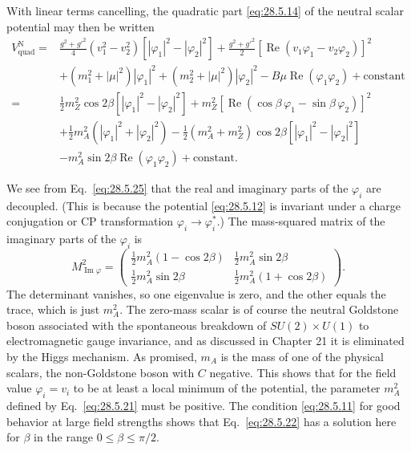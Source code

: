 With linear terms cancelling, the quadratic part \eqref{eq:28.5.14} of
the neutral scalar potential may then be written
\begin{equation}
  \begin{aligned}
  V_{\mathrm{quad}}^{\mathrm N}
  ={}&
    \frac{g^2+g'^2}{4}(v_1^2-v_2^2)
      \left[|\varphi_1|^2-|\varphi_2|^2\right]
    +\frac{g^2+g'^2}{2}
      \left[\operatorname{Re}(v_1\varphi_1-v_2\varphi_2)\right]^2\\
  &+(m_1^2+|\mu|^2)|\varphi_1|^2
    +(m_2^2+|\mu|^2)|\varphi_2|^2
    -B\mu\operatorname{Re}(\varphi_1\varphi_2)
    +\text{constant}\\
  ={}&
    \frac12m_Z^2\cos2\beta
      \left[|\varphi_1|^2-|\varphi_2|^2\right]
    +m_Z^2
      \left[
        \operatorname{Re}(\cos\beta\,\varphi_1-\sin\beta\,\varphi_2)
      \right]^2\\
  &+\frac12m_A^2\left(|\varphi_1|^2+|\varphi_2|^2\right)
    -\frac12(m_A^2+m_Z^2)\cos2\beta
      \left[|\varphi_1|^2-|\varphi_2|^2\right]\\
  &-m_A^2\sin2\beta\operatorname{Re}(\varphi_1\varphi_2)
    +\text{constant}.
  \end{aligned}
  \tag{28.5.25}\label{eq:28.5.25}
\end{equation}

We see from Eq.~\eqref{eq:28.5.25} that the real and imaginary parts of
the \(\varphi_i\) are decoupled. (This is because the potential
\eqref{eq:28.5.12} is invariant under a charge conjugation or CP
transformation \(\varphi_i\longrightarrow\varphi_i^*\).) The mass-squared
matrix of the imaginary parts of the \(\varphi_i\) is
\begin{equation}
  M_{\operatorname{Im}\varphi}^2
  =
  \begin{pmatrix}
    \frac12m_A^2(1-\cos2\beta) & \frac12m_A^2\sin2\beta\\
    \frac12m_A^2\sin2\beta & \frac12m_A^2(1+\cos2\beta)
  \end{pmatrix}.
  \tag{28.5.26}\label{eq:28.5.26}
\end{equation}
The determinant vanishes, so one eigenvalue is zero, and the other equals
the trace, which is just \(m_A^2\). The zero-mass scalar is of course the
neutral Goldstone boson associated with the spontaneous breakdown of
\(SU(2)\times U(1)\) to electromagnetic gauge invariance, and as
discussed in Chapter 21 it is eliminated by the Higgs mechanism. As
promised, \(m_A\) is the mass of one of the physical scalars, the
non-Goldstone boson with \(C\) negative. This shows that for the field value
\(\varphi_i=v_i\) to be at least a local minimum of the potential, the
parameter \(m_A^2\) defined by Eq.~\eqref{eq:28.5.21} must be positive.
The condition \eqref{eq:28.5.11} for good behavior at large field strengths
shows that Eq.~\eqref{eq:28.5.22} has a solution here for \(\beta\) in the
range \(0\leq\beta\leq\pi/2\).

